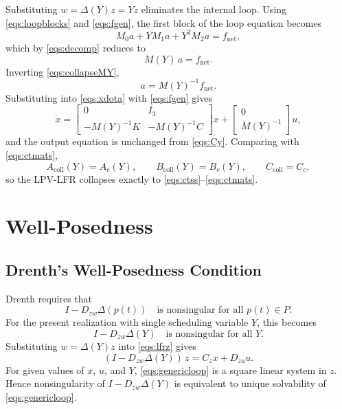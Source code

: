 \documentclass[11pt]{article}
\begin{document}
Substituting $w = \Delta(Y)z = Yz$ eliminates the internal loop. Using
\eqref{eqs:loopblocks} and \eqref{eqs:fgen}, the first block of the loop
equation becomes
\begin{equation}
    M_0 a + YM_1 a + Y^2 M_2 a = f_{\mathrm{net}},
    \label{eqs:collapsecollect}
\end{equation}
which by \eqref{eqs:decomp} reduces to
\begin{equation}
    M(Y)\,a = f_{\mathrm{net}}.
    \label{eqs:collapseMY}
\end{equation}
Inverting \eqref{eqs:collapseMY},
\begin{equation}
    a = M(Y)^{-1} f_{\mathrm{net}}.
    \label{eqs:collapsevinv}
\end{equation}
Substituting into \eqref{eqs:xdota} with \eqref{eqs:fgen} gives
\begin{equation}
    \dot{x}
    =
    \begin{bmatrix}
        0 & I_3 \\
        -M(Y)^{-1}K & -M(Y)^{-1}C
    \end{bmatrix}
    x
    +
    \begin{bmatrix}
        0 \\
        M(Y)^{-1}
    \end{bmatrix}
    u,
    \label{eqs:recoverstate}
\end{equation}
and the output equation is unchanged from \eqref{eqs:Cy}. Comparing with
\eqref{eqs:ctmats},
\begin{equation}
    A_{\mathrm{coll}}(Y) = A_c(Y),
    \qquad
    B_{\mathrm{coll}}(Y) = B_c(Y),
    \qquad
    C_{\mathrm{coll}} = C_c,
    \label{eqs:collapsedequal}
\end{equation}
so the LPV-LFR collapses exactly to \eqref{eqs:ctss}--\eqref{eqs:ctmats}.

\section{Well-Posedness}
\subsection{Drenth's Well-Posedness Condition}
Drenth requires that
\begin{equation}
    I - D_{zw}\Delta(p(t))
    \quad \text{is nonsingular for all } p(t)\in P.
    \label{eqs:drenthcriterion}
\end{equation}
For the present realization with single scheduling variable $Y$, this becomes
\begin{equation}
    I - D_{zw}\Delta(Y)
    \quad \text{is nonsingular for all } Y.
    \label{eqs:presentcriterion}
\end{equation}
Substituting $w=\Delta(Y)z$ into \eqref{eqs:lfrz} gives
\begin{equation}
    (I - D_{zw}\Delta(Y))\,z = C_zx + D_{zu}u.
    \label{eqs:genericloop}
\end{equation}
For given values of $x$, $u$, and $Y$, \eqref{eqs:genericloop} is a square
linear system in $z$. Hence nonsingularity of $I-D_{zw}\Delta(Y)$ is equivalent
to unique solvability of \eqref{eqs:genericloop}.
\end{document}
